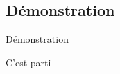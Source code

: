 \documentclass{beamer} %
\begin{document}

\subsection{Démonstration}

\begin{frame}{Démonstration}
    \centerline{C'est parti}
\end{frame}
\end{document}
